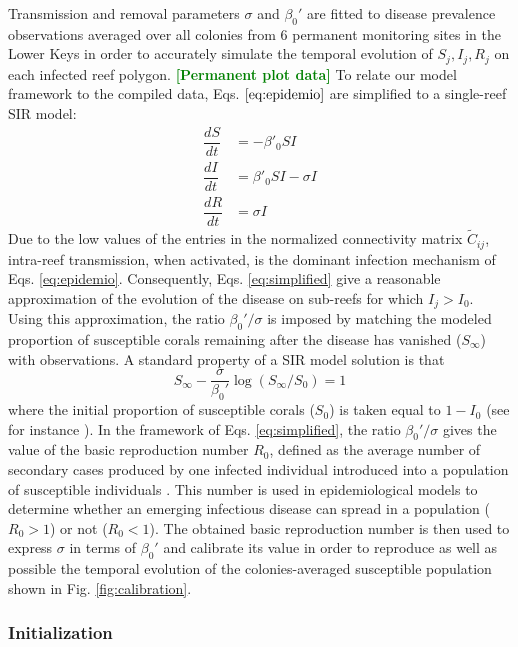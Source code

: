 \documentclass[utf8]{frontiersSCNS}
\newcommand{\erinn}[1]{\textbf{\textcolor{green}{#1}}}
\begin{document}
Transmission and removal parameters $\sigma$ and $\beta_0'$ are fitted to disease prevalence observations averaged over all colonies from 6 permanent monitoring sites in the Lower Keys in order to accurately simulate the temporal evolution of $S_j,I_j,R_j$ on each infected reef polygon. \erinn{[Permanent plot data]}
To relate our model framework to the compiled data, Eqs. $\ref{eq:epidemio}$ are simplified to a single-reef SIR model:
\begin{equation}
    \begin{aligned}
        \dfrac{dS}{dt} &= -\beta'_0SI \\
        \dfrac{dI}{dt} &= \beta'_0SI - \sigma I \\
        \dfrac{dR}{dt} &= \sigma I
    \end{aligned}\label{eq:simplified}
\end{equation}
Due to the low values of the entries in the normalized connectivity matrix $\tilde{C}_{ij}$, intra-reef transmission, when activated, is the dominant infection mechanism of Eqs. \ref{eq:epidemio}. Consequently, Eqs. \ref{eq:simplified} give a reasonable approximation of the evolution of the disease on sub-reefs for which $I_j > I_0$. Using this approximation, the ratio $\beta_0'/\sigma$ is imposed by matching the modeled proportion of susceptible corals remaining after the disease has vanished ($S_\infty$) with observations. A standard property of a SIR model solution is that
\begin{equation}
    S_\infty - \frac{\sigma}{\beta_0'}\log(S_{\infty}/S_0) = 1\label{eq:ratio}
\end{equation}
where the initial proportion of susceptible corals ($S_0$) is taken equal to $1-I_0$ (see for instance \cite{Murray07}). In the framework of Eqs. \ref{eq:simplified}, the ratio $\beta_0'/\sigma$ gives the value of the basic reproduction number $R_0$, defined as the average number of secondary cases produced by one infected individual introduced into a population of susceptible individuals \citep{keeling2007stochastic}. This number is used in epidemiological models to determine whether an emerging infectious disease can spread in a population ($R_0 > 1$) or not ($R_0 < 1$). The obtained basic reproduction number is then used to express $\sigma$ in terms of $\beta_0'$ and calibrate its value in order to reproduce as well as possible the temporal evolution of the colonies-averaged susceptible population shown in Fig. \ref{fig:calibration}.

\subsubsection{Initialization} \label{sec:init}
\end{document}

